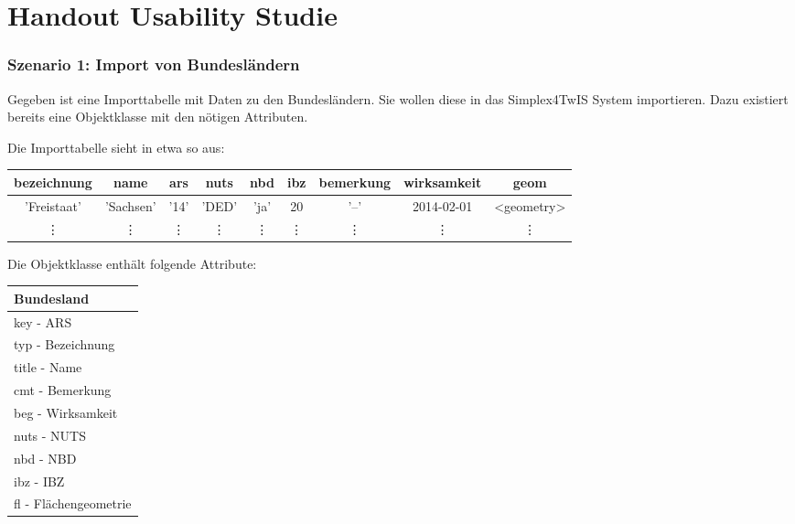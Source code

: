 \ifdefined\STANDALONE\else
  \chapter{Handout Usability Studie}
  \label{app:handout}
\fi

\subsection*{Szenario 1: Import von Bundesländern}

\vspace{\baselineskip}\noindent
Gegeben ist eine Importtabelle mit Daten zu den Bundesländern. Sie wollen diese in das Simplex4TwIS System importieren. Dazu existiert bereits eine Objektklasse mit den nötigen Attributen.

\vspace{\baselineskip}\noindent
Die Importtabelle sieht in etwa so aus:

\begin{flushleft}
  \begin{tabular}{||c | c | c | c | c | c | c | c | c ||}
    \hline
    bezeichnung & name      & ars    & nuts   & nbd    & ibz    & bemerkung & wirksamkeit & geom       \\ [0.5ex]
    \hline\hline
    'Freistaat' & 'Sachsen' & '14'   & 'DED'  & 'ja'   & 20     & '--'      & 2014-02-01  & <geometry> \\
    \hline
    \vdots      & \vdots    & \vdots & \vdots & \vdots & \vdots & \vdots    & \vdots      & \vdots     \\
    \hline
  \end{tabular}
\end{flushleft}

\vspace{\baselineskip}\noindent
Die Objektklasse enthält folgende Attribute:
\begin{flushleft}
  \begin{tabular}{ || l || }
    \hline
    Bundesland            \\
    \hline
    key - ARS             \\
    typ - Bezeichnung     \\
    title - Name          \\
    cmt - Bemerkung       \\
    beg - Wirksamkeit     \\
    nuts - NUTS           \\
    nbd - NBD             \\
    ibz - IBZ             \\
    fl - Flächengeometrie \\
    \hline
  \end{tabular}
\end{flushleft}

